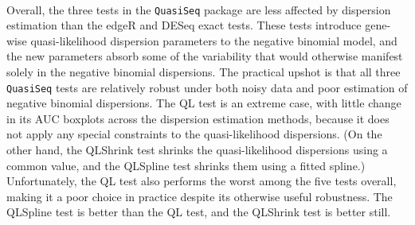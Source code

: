 \documentclass[10pt]{article}
\begin{document}
%

{
\paragraph{} \indent Overall, the three tests in the {\tt QuasiSeq} package are less affected by dispersion estimation than the edgeR and DESeq exact tests. These tests introduce gene-wise quasi-likelihood dispersion parameters to the negative binomial model, and the new parameters absorb some of the variability that would otherwise manifest solely in the negative binomial dispersions. The practical upshot is that all three {\tt QuasiSeq} tests are relatively robust under both noisy data and poor estimation of negative binomial dispersions. The QL test is an extreme case, with little change in its AUC boxplots across the dispersion estimation methods, because it does not apply any special constraints to the quasi-likelihood dispersions. (On the other hand, the QLShrink test shrinks the quasi-likelihood dispersions using a common value, and the QLSpline test shrinks them using a fitted spline.) Unfortunately, the QL test also performs the worst among the five tests overall, making it a poor choice in practice despite its otherwise useful robustness. The QLSpline test is better than the QL test, and the QLShrink test is better still. }
\end{document}
